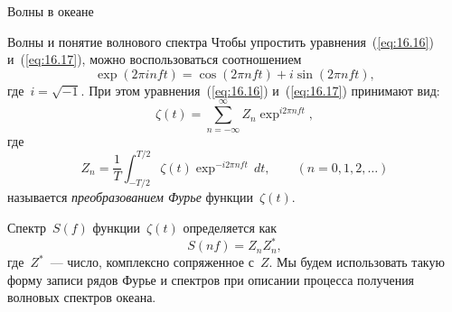 \begin{chapter}{Волны в океане}
\begin{section}{Волны и понятие волнового спектра}
Чтобы упростить уравнения~(\ref{eq:16.16}) и~(\ref{eq:16.17}), можно 
воспользоваться соотношением
\begin{equation}
 \exp (2\pi inft) = \cos (2\pi nft) + i \sin (2\pi nft),
\end{equation}
где~$i = \sqrt{-1}$. При этом уравнения~(\ref{eq:16.16}) и~(\ref{eq:16.17}) 
принимают вид:
\begin{equation}\label{eq:16.19}
 \zeta (t) = \sum_{n=-\infty}^{\infty} Z_n \exp ^{i2\pi nft},
\end{equation}
где
\begin{equation}\label{eq:16.20}
  Z_n = \frac{1}{T} \int_{-T/2}^{T/2} \zeta (t) \exp ^{-i2\pi nft} \, dt, 
   \qquad (n=0,1,2,\ldots)
\end{equation}
называется \emph{преобразованием Фурье}%
функции~$\zeta (t)$.
%

Спектр~$S(f)$ функции~$\zeta (t)$ определяется как
\begin{equation}
 S(nf) = Z_n Z^*_n,
\end{equation}
где~$Z^*$~--- число, комплексно сопряженное с~$Z$. Мы будем использовать
такую форму записи рядов Фурье и спектров при описании процесса получения
волновых спектров океана.
%


\end{section}
\end{chapter}

